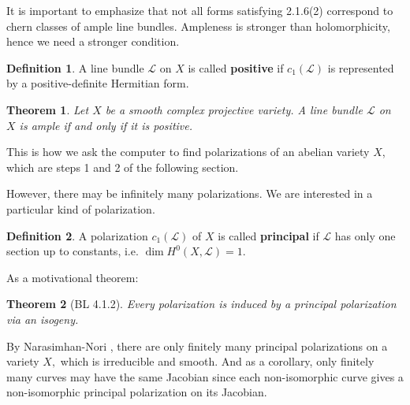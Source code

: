 \documentclass[12pt,reqno]{amsart}
\newcommand{\C}{\mathbb{C}}
\newcommand{\R}{\mathbb{R}}
\newcommand{\mc}{\mathcal}
\newtheorem*{thm*}{Theorem}
\theoremstyle{definition}
\newtheorem{defn}{Definition}
\theoremstyle{remark}
\newtheorem*{remark}{Remark}
\begin{document}
It is important to emphasize that not all forms satisfying 2.1.6(2) correspond to chern classes of ample line bundles. Ampleness is stronger than holomorphicity, hence we need a stronger condition. 

\begin{defn} 
A line bundle $\mc{L}$ on $X$ is called \textbf{positive} if $c_1(\mc{L})$ is represented by a positive-definite Hermitian form.
\end{defn}

\begin{thm*} 
Let $X$ be a smooth complex projective variety. A line bundle $\mc{L}$ on $X$ is ample if and only if it is positive.
\end{thm*}



This is how we ask the computer to find polarizations of an abelian variety $X$, which are steps 1 and 2 of the following section.

However, there may be infinitely many polarizations. We are interested in a particular kind of polarization.

\begin{defn}  A polarization $c_1(\mc{L})$ of $X$ is called \textbf{principal} if $\mc{L}$ has only one section up to constants, i.e. $\dim H^0(X, \mc{L}) = 1$.  \end{defn} 

As a motivational theorem:

\begin{thm*} [BL 4.1.2] Every polarization is induced by a principal polarization via an isogeny. \end{thm*}

By Narasimhan-Nori \cite{nn}, there are only finitely many principal polarizations on a variety $X,$ which is irreducible and smooth. And as a corollary, only finitely many curves may have the same Jacobian since each non-isomorphic curve gives a non-isomorphic principal polarization on its Jacobian.
\end{document}
